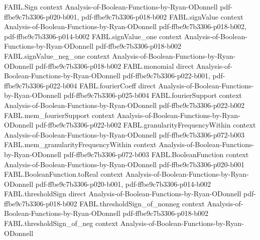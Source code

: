 \begin{theorem}
\label{FABL.norm_discreteGradient_toReal_sq_eq_sensitivity}
\leanok
{}
\proofstep
  {FABL.Sign}
  {context}
  {Analysis-of-Boolean-Functions-by-Ryan-ODonnell}
  {pdf-ffbe9c7b3306-p020-b001,
    pdf-ffbe9c7b3306-p018-b002}
\proofstep
  {FABL.signValue}
  {context}
  {Analysis-of-Boolean-Functions-by-Ryan-ODonnell}
  {pdf-ffbe9c7b3306-p018-b002,
    pdf-ffbe9c7b3306-p014-b002}
\proofstep
  {FABL.signValue_one}
  {context}
  {Analysis-of-Boolean-Functions-by-Ryan-ODonnell}
  {pdf-ffbe9c7b3306-p018-b002}
\proofstep
  {FABL.signValue_neg_one}
  {context}
  {Analysis-of-Boolean-Functions-by-Ryan-ODonnell}
  {pdf-ffbe9c7b3306-p018-b002}
\proofstep
  {FABL.monomial}
  {direct}
  {Analysis-of-Boolean-Functions-by-Ryan-ODonnell}
  {pdf-ffbe9c7b3306-p022-b001,
    pdf-ffbe9c7b3306-p022-b004}
\proofstep
  {FABL.fourierCoeff}
  {direct}
  {Analysis-of-Boolean-Functions-by-Ryan-ODonnell}
  {pdf-ffbe9c7b3306-p025-b004}
\proofstep
  {FABL.fourierSupport}
  {context}
  {Analysis-of-Boolean-Functions-by-Ryan-ODonnell}
  {pdf-ffbe9c7b3306-p022-b002}
\proofstep
  {FABL.mem_fourierSupport}
  {context}
  {Analysis-of-Boolean-Functions-by-Ryan-ODonnell}
  {pdf-ffbe9c7b3306-p022-b002}
\proofstep
  {FABL.granularityFrequencyWithin}
  {context}
  {Analysis-of-Boolean-Functions-by-Ryan-ODonnell}
  {pdf-ffbe9c7b3306-p072-b003}
\proofstep
  {FABL.mem_granularityFrequencyWithin}
  {context}
  {Analysis-of-Boolean-Functions-by-Ryan-ODonnell}
  {pdf-ffbe9c7b3306-p072-b003}
\proofstep
  {FABL.BooleanFunction}
  {context}
  {Analysis-of-Boolean-Functions-by-Ryan-ODonnell}
  {pdf-ffbe9c7b3306-p020-b001}
\proofstep
  {FABL.BooleanFunction.toReal}
  {context}
  {Analysis-of-Boolean-Functions-by-Ryan-ODonnell}
  {pdf-ffbe9c7b3306-p020-b001,
    pdf-ffbe9c7b3306-p014-b002}
\proofstep
  {FABL.thresholdSign}
  {direct}
  {Analysis-of-Boolean-Functions-by-Ryan-ODonnell}
  {pdf-ffbe9c7b3306-p018-b002}
\proofstep
  {FABL.thresholdSign_of_nonneg}
  {context}
  {Analysis-of-Boolean-Functions-by-Ryan-ODonnell}
  {pdf-ffbe9c7b3306-p018-b002}
\proofstep
  {FABL.thresholdSign_of_neg}
  {context}
  {Analysis-of-Boolean-Functions-by-Ryan-ODonnell}

\end{theorem}
